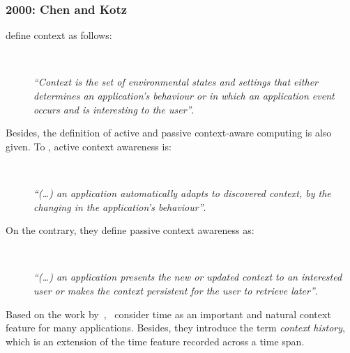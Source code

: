 \subsubsection{2000: Chen and Kotz}
\label{sec:chen}

\citet{chen_survey_2000} define context as follows: 

\begin{description}
  \item[] \hfill \\
  \begin{mdframed}[hidealllines=true,backgroundcolor=gray!20]
  \textit{``Context is the set of environmental states and settings that either 
  determines an application’s behaviour or in which an application event occurs 
  and is interesting to the user''}.
  \end{mdframed}
\end{description}

Besides, the definition of active and passive context-aware computing is also 
given. To \citeauthor{chen_survey_2000}, active context awareness is:

\begin{description}
  \item[] \hfill \\
  \begin{mdframed}[hidealllines=true,backgroundcolor=gray!20]
  \textit{``(\dots) an application automatically adapts to discovered context, by the 
  changing in the application's behaviour''}.
  \end{mdframed}
\end{description}

On the contrary, they define passive context awareness as:

\begin{description}
  \item[] \hfill \\
  \begin{mdframed}[hidealllines=true,backgroundcolor=gray!20]
  \textit{``(\dots) an application presents the new or updated context to an interested
  user or makes the context persistent for the user to retrieve later''}.
  \end{mdframed}
\end{description}

Based on the work by~\citet{schilit_context_aware_1994},~\citet{chen_survey_2000}
consider time as an important and natural context feature for many 
applications. Besides, they introduce the term \textit{context history}, which 
is an extension of the time feature recorded across a time span.

